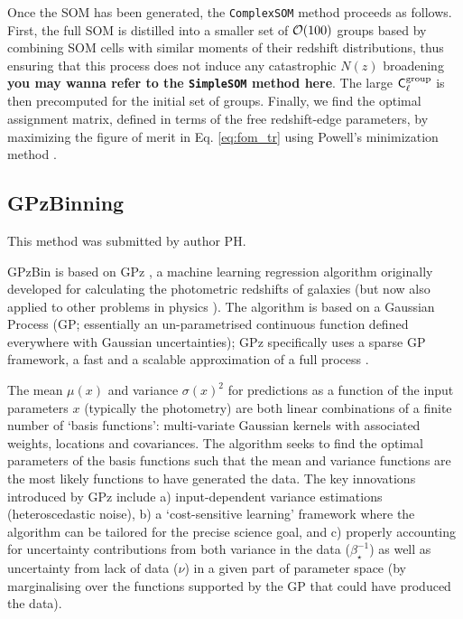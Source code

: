 \documentclass[twocolumn,twocolappendix]{aastex63}
\begin{document}
Once the SOM has been generated, the {\tt ComplexSOM} method proceeds as
follows. First, the full SOM is distilled into a smaller set of ${\cal O}(100)$
groups based by combining SOM cells with similar moments of their redshift
distributions, thus ensuring that this process does not induce any catastrophic
$N(z)$ broadening {\bf you may wanna refer to the {\tt SimpleSOM} method here}.
The large ${\sf C}^{\rm group}_\ell$ is then precomputed for the initial set of
groups. Finally, we find the optimal assignment matrix, defined in terms of the
free redshift-edge parameters, by maximizing the figure of merit in Eq.
\ref{eq:fom_tr} using Powell's minimization method
\citep{10.1093/comjnl/7.2.155}.



\subsection{ {\sc GPzBinning} }
This method was submitted by author PH.

GPzBin is based on GPz \citep{Almosallam2016a,Almosallam2016b}, a machine learning
regression algorithm originally developed for calculating the photometric
redshifts of galaxies \citep{Gomes2017,Duncan2018,Hatfield2020} (but now also
applied to other problems in physics \citep{Peng2019,Hatfield2020}). The
algorithm is based on a Gaussian Process (GP; essentially an un-parametrised continuous
function defined everywhere with Gaussian uncertainties); GPz specifically uses 
a sparse GP framework, a fast and a scalable approximation
of a full process \citep{Rasmussen2006}.

The mean $\mu(x)$ and variance $\sigma(x)^2$ for predictions as a function of
the input parameters $x$ (typically the photometry) are both linear combinations
of a finite number of `basis functions': multi-variate Gaussian kernels with
associated weights, locations and covariances. The algorithm seeks to find the
optimal parameters of the basis functions such that the mean and variance
functions are the most likely functions to have generated the data. The key
innovations introduced by GPz include a) input-dependent variance estimations
(heteroscedastic noise), b) a `cost-sensitive learning' framework where the
algorithm can be tailored for the precise science goal, and c) properly
accounting for uncertainty contributions from both variance in the data
($\beta^{-1}_{\star}$) as well as uncertainty from lack of data ($\nu$) in a
given part of parameter space (by marginalising over the functions supported by
the GP that could have produced the data).
\end{document}
